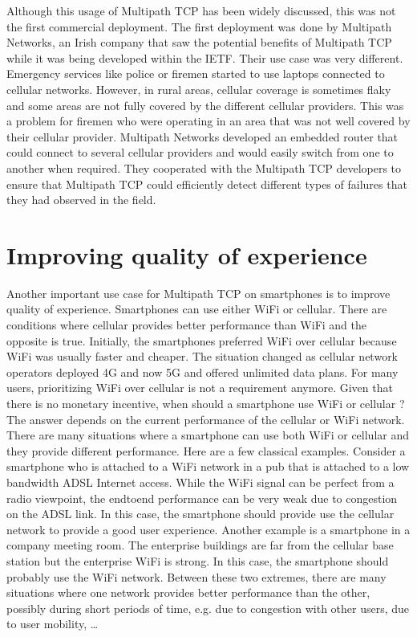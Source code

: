 \documentclass[letterpaper,10pt,english]{sphinxmanual}
\begin{document}
\sphinxAtStartPar
Although this usage of Multipath TCP has been widely discussed, this was not the first commercial deployment. The first deployment was done by Multipath Networks, an Irish company that saw the potential benefits of Multipath TCP while it was being developed within the IETF. Their use case was very different. Emergency services like police or firemen started to use laptops connected to cellular networks. However, in rural areas, cellular coverage is sometimes flaky and some areas are not fully covered by the different cellular providers. This was a problem for firemen who were operating in an area that was not well covered by their cellular provider. Multipath Networks developed an embedded router that could connect to several cellular providers and would easily switch from one to another when required. They cooperated with the Multipath TCP developers to ensure that Multipath TCP could efficiently detect different types of failures that they had observed in the field.


\section{Improving quality of experience}
\label{\detokenize{usecases:improving-quality-of-experience}}
\sphinxAtStartPar
Another important use case for Multipath TCP on smartphones is to improve quality of experience. Smartphones can use either Wi\sphinxhyphen{}Fi or cellular. There are conditions where cellular provides better performance than Wi\sphinxhyphen{}Fi and the opposite is true. Initially, the smartphones preferred Wi\sphinxhyphen{}Fi over cellular because Wi\sphinxhyphen{}Fi was usually faster and cheaper. The situation changed as cellular network operators deployed 4G and now 5G and offered unlimited data plans. For many users, prioritizing Wi\sphinxhyphen{}Fi over cellular is not a requirement anymore. Given that there is no monetary incentive, when should a smartphone use Wi\sphinxhyphen{}Fi or cellular ? The answer depends on the current performance of the cellular or Wi\sphinxhyphen{}Fi network. There are many situations where a smartphone can use both Wi\sphinxhyphen{}Fi or cellular and they provide different performance. Here are a few classical examples. Consider a smartphone who is attached to a Wi\sphinxhyphen{}Fi network in a pub that is attached to a low bandwidth ADSL Internet access. While the Wi\sphinxhyphen{}Fi signal can be perfect from a radio viewpoint, the end\sphinxhyphen{}to\sphinxhyphen{}end performance can be very weak due to congestion on the ADSL link. In this case, the smartphone should provide use the cellular network to provide a good user experience. Another example is a smartphone in a company meeting room. The enterprise buildings are far from the cellular base station but the enterprise Wi\sphinxhyphen{}Fi is strong. In this case, the smartphone should probably use the Wi\sphinxhyphen{}Fi network. Between these two extremes, there are many situations where one network provides better performance than the other, possibly during short periods of time, e.g. due to congestion with other users, due to user mobility, …
\end{document}

